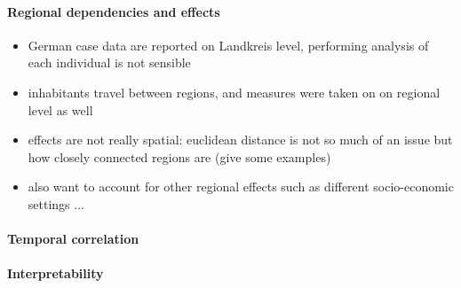 \paragraph{Regional dependencies and effects}
\begin{itemize}
    \item German case data are reported on Landkreis level, performing analysis of each individual is not sensible 
    \item inhabitants travel between regions, and measures were taken on on regional level as well
    \item effects are not really spatial: euclidean distance is not so much of an issue but how closely connected regions are (give some examples)
    \item also want to account for other regional effects such as different socio-economic settings ... 
\end{itemize}

\paragraph{Temporal correlation}

\paragraph{Interpretability}



